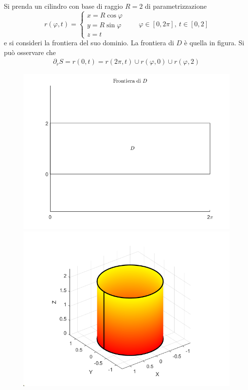  \begin{example}
     Si prenda un cilindro con base di raggio $R=2$ di parametrizzazione
     \begin{equation*}
         r(\varphi,t)=\begin{cases}
             x= R \cos \varphi\\
             y= R \sin \varphi\\
             z=t
         \end{cases}
         \qquad \varphi \in [0, 2\pi],\ t \in [0, 2]
     \end{equation*}
     e si consideri la frontiera del suo dominio.
     La frontiera di $D$ è quella in figura. Si può osservare che
     \begin{align*}
         \partial_r S = r(0,t) = r(2\pi, t) \cup r(\varphi, 0) \cup r(\varphi, 2)
     \end{align*}
     \begin{figure}[H]
     \begin{minipage}{0.4\textwidth}
     \includegraphics[width=\textwidth]{Capitoli/Capitolo6/Frontiera D.png}
     \end{minipage}
     \centering
     \begin{minipage}{0.5\textwidth}
     \includegraphics[width=\textwidth]{Capitoli/Capitolo6/Bordo parametrico cilindro.png}

\end{minipage}
\end{figure}
\end{example}
